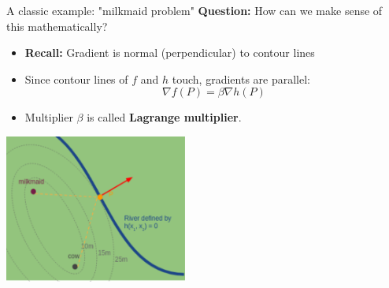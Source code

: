 \documentclass[11pt,compress,t,notes=noshow, xcolor=table]{beamer}
\begin{document}
\begin{vbframe}{A classic example: "milkmaid problem"}
\textbf{Question:} How can we make sense of this mathematically?

\framebreak

\begin{itemize}
    \item \textbf{Recall:} Gradient is normal (perpendicular) to contour lines
    \item Since contour lines of $f$ and $h$ touch, gradients are parallel:
        \begin{equation*}
            \nabla f(P) = \beta \nabla h(P)
        \end{equation*}
    \item Multiplier $\beta$ is called \textbf{Lagrange multiplier}.
\end{itemize}

\begin{center}
	\includegraphics[width=0.45\textwidth]{figure_man/milkmaid5.png}
\end{center}

\end{vbframe}
\end{document}
